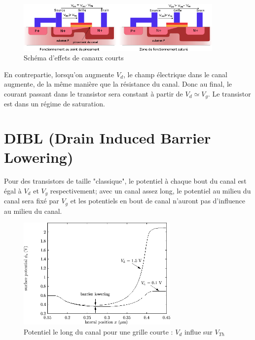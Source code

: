 \documentclass[a4paper,11pt]{report}
\begin{document}
\begin{figure}[h]
    \begin{center}
        \includegraphics[width=0.9\textwidth]{Images/Canaux_Courts.png}
        \caption{Schéma d'effets de canaux courts}
        \label{fig:}
    \end{center}
\end{figure}

En contrepartie, lorsqu'on augmente $V_d$, le champ électrique dans le canal augmente, de la même manière que la résistance du canal. Donc au final, le courant passant dans le transistor sera constant à partir de $V_d \simeq V_g$. Le transistor est dans un régime de saturation.

\section{DIBL (Drain Induced Barrier Lowering)}
Pour des transistors de taille "classique", le potentiel à chaque bout du canal est égal à $V_d$ et $V_g$ respectivement; avec un canal assez long, le potentiel au milieu du canal sera fixé par $V_g$ et les potentiels en bout de canal n'auront pas d'influence au milieu du canal.

\begin{figure}[h]
    \begin{center}
        \includegraphics[width=0.7\textwidth]{Images/DIBL_schema.png}
        \caption{Potentiel le long du canal pour une grille courte : $V_d$ influe sur $V_{Th}$}
        \label{fig:}
    \end{center}
\end{figure}
\end{document}

